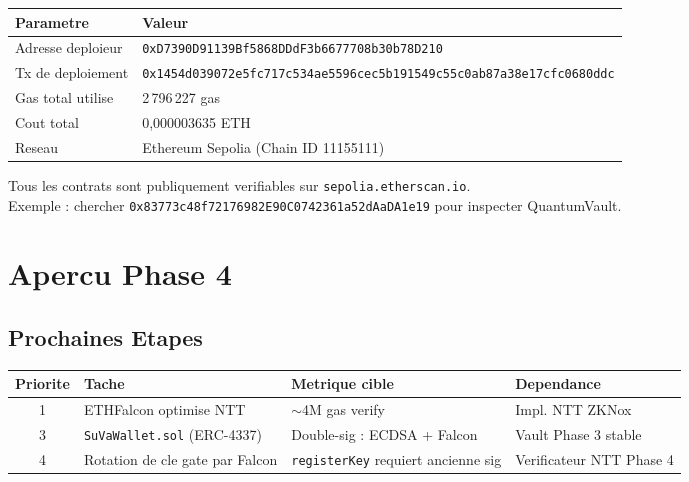 \documentclass[11pt,a4paper]{article}
\begin{document}
\begin{center}
\begin{tabular}{ll}
\toprule
\textbf{Parametre} & \textbf{Valeur} \\
\midrule
Adresse deploieur   & \texttt{0xD7390D91139Bf5868DDdF3b6677708b30b78D210} \\
Tx de deploiement   & \texttt{0x1454d039072e5fc717c534ae5596cec5b191549c55c0ab87a38e17cfc0680ddc} \\
Gas total utilise   & 2\,796\,227 gas \\
Cout total          & 0,000003635 ETH \\
Reseau              & Ethereum Sepolia (Chain ID 11155111) \\
\bottomrule
\end{tabular}
\end{center}

\begin{infobox}
Tous les contrats sont publiquement verifiables sur \texttt{sepolia.etherscan.io}.\\
Exemple : chercher \texttt{0x83773c48f72176982E90C0742361a52dAaDA1e19} pour inspecter QuantumVault.
\end{infobox}

\section{Apercu Phase 4}

\subsection{Prochaines Etapes}

\begin{center}
\begin{tabular}{clll}
\toprule
\textbf{Priorite} & \textbf{Tache} & \textbf{Metrique cible} & \textbf{Dependance} \\
\midrule
1 & ETHFalcon optimise NTT & $\sim$4M gas verify & Impl. NTT ZKNox \\
3 & \texttt{SuVaWallet.sol} (ERC-4337) & Double-sig : ECDSA + Falcon & Vault Phase 3 stable \\
4 & Rotation de cle gate par Falcon & \texttt{registerKey} requiert ancienne sig & Verificateur NTT Phase 4 \\
\bottomrule
\end{tabular}
\end{center}
\end{document}
